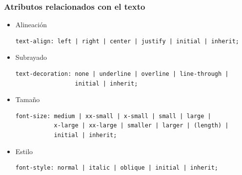 \documentclass[ucs]{beamer}
\begin{document}
\begin{frame}[fragile]
\frametitle{Atributos relacionados con el texto}
\begin{itemize}
\item
Alineación

  \begin{footnotesize}
  \begin{verbatim}
text-align: left | right | center | justify | initial | inherit;
  \end{verbatim}
  \end{footnotesize}

\item
Subrayado


  \begin{footnotesize}
  \begin{verbatim}
text-decoration: none | underline | overline | line-through |
                 initial | inherit;
  \end{verbatim}
  \end{footnotesize}



\item
Tamaño

  \begin{footnotesize}
  \begin{verbatim}
font-size: medium | xx-small | x-small | small | large | 
           x-large | xx-large | smaller | larger | (length) |
           initial | inherit;
  \end{verbatim}
  \end{footnotesize}


\item
Estilo

  \begin{footnotesize}
  \begin{verbatim}
font-style: normal | italic | oblique | initial | inherit;

  \end{verbatim}
  \end{footnotesize}



\end{itemize}

\end{frame}
\end{document}
